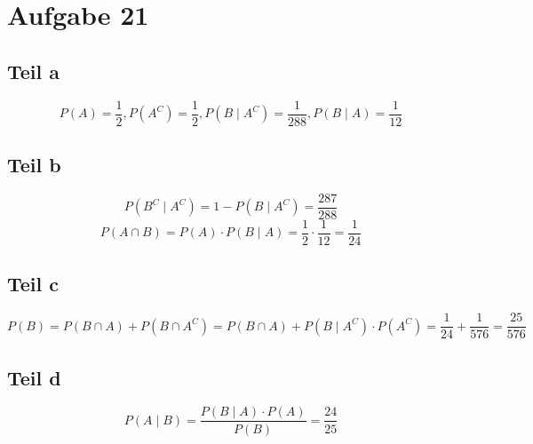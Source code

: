 \documentclass[10pt,a4paper]{article}
\begin{document}
\section{Aufgabe 21}

\subsection{Teil a}
\begin{equation}
  P(A) = \frac{1}{2}, P(A^{C}) = \frac{1}{2}, P(B \mid A^{C}) = \frac{1}{288}, P(B \mid A) = \frac{1}{12}
\end{equation}

\subsection{Teil b}
\begin{equation}
  P(B^{C} \mid A^{C}) = 1 - P(B \mid A^{C}) = \frac{287}{288}
\end{equation}
\begin{equation}
  P(A \cap B) = P(A) \cdot P(B \mid A) = \frac{1}{2} \cdot \frac{1}{12} = \frac{1}{24}
\end{equation}

\subsection{Teil c}
\begin{equation}
  P(B) = P(B \cap A) + P(B \cap A^{C}) = P(B \cap A) + P(B \mid A^{C}) \cdot P(A^{C}) = \frac{1}{24} + \frac{1}{576} = \frac{25}{576}
\end{equation}

\subsection{Teil d}
\begin{equation}
  P(A \mid B) = \frac{P(B \mid A) \cdot P(A)}{P(B)} = \frac{24}{25}
\end{equation}
\end{document}
